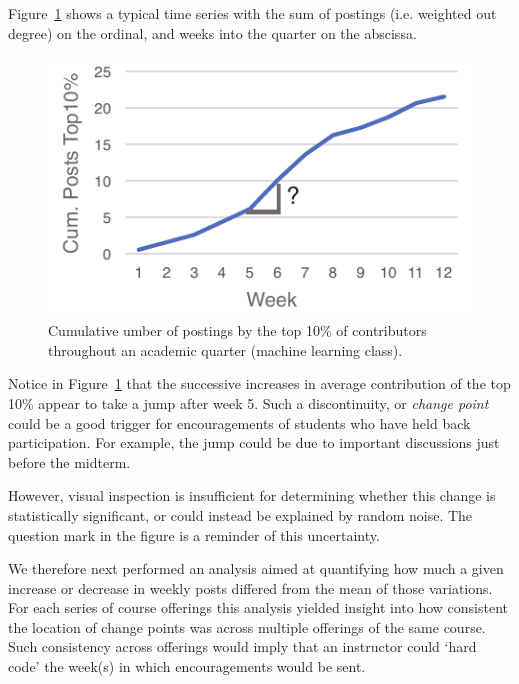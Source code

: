 Figure~\ref{fig:cs229OutDeg} shows a typical time series with the sum
of postings (i.e. weighted out degree) on the ordinal, and weeks into
the quarter on the abscissa.
\begin{figure}[htp]
       \centering
       \includegraphics{Figs/CS229Fall15DataContributionsNoFrills.pdf}
       \caption{\textnormal{Cumulative umber of postings by the top 10\% of
           contributors throughout an academic quarter (machine
           learning class).}}
       \label{fig:cs229OutDeg}
\end{figure}
Notice in Figure~\ref{fig:cs229OutDeg} that the successive increases
in average contribution of the top 10\% appear to take a jump after
week 5. Such a discontinuity, or {\em change point} could be a good
trigger for encouragements of students who have held back
participation. For example, the jump could be due to important
discussions just before the midterm.

However, visual inspection is insufficient for determining whether
this change is statistically significant, or could instead be
explained by random noise. The question mark in the figure is a
reminder of this uncertainty.

We therefore next performed an analysis aimed at quantifying how much
a given increase or decrease in weekly posts differed from the mean of
those variations. For each series of course offerings this analysis
yielded insight into how consistent the location of change points was
across multiple offerings of the same course. Such consistency across
offerings would imply that an instructor could `hard code' the week(s)
in which encouragements would be sent.


